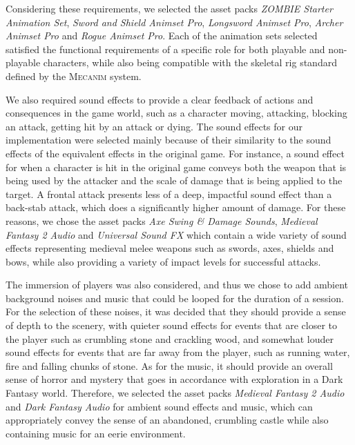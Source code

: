 Considering these requirements, we selected the asset packs \emph{ZOMBIE Starter Animation Set}, \emph{Sword and Shield Animset Pro}, \emph{Longsword Animset Pro}, \emph{Archer Animset Pro} and \emph{Rogue Animset Pro}. Each of the animation sets selected satisfied the functional requirements of a specific role for both playable and non-playable characters, while also being compatible with the skeletal rig standard defined by the \textsc{Mecanim} system.

We also required sound effects to provide a clear feedback of actions and consequences in the game world, such as a character moving, attacking, blocking an attack, getting hit by an attack or dying. The sound effects for our implementation were selected mainly because of their similarity to the sound effects of the equivalent effects in the original game. For instance, a sound effect for when a character is hit in the original game conveys both the weapon that is being used by the attacker and the scale of damage that is being applied to the target. A frontal attack presents less of a deep, impactful sound effect than a back-stab attack, which does a significantly higher amount of damage. For these reasons, we chose the asset packs \emph{Axe Swing \& Damage Sounds}, \emph{Medieval Fantasy 2 Audio} and \emph{Universal Sound FX} which contain a wide variety of sound effects representing medieval melee weapons such as swords, axes, shields and bows, while also providing a variety of impact levels for successful attacks.

The immersion of players was also considered, and thus we chose to add ambient background noises and music that could be looped for the duration of a session. For the selection of these noises, it was decided that they should provide a sense of depth to the scenery, with quieter sound effects for events that are closer to the player such as crumbling stone and crackling wood, and somewhat louder sound effects for events that are far away from the player, such as running water, fire and falling chunks of stone. As for the music, it should provide an overall sense of horror and mystery that goes in accordance with exploration in a Dark Fantasy world. Therefore, we selected the asset packs \emph{Medieval Fantasy 2 Audio} and \emph{Dark Fantasy Audio} for ambient sound effects and music, which can appropriately convey the sense of an abandoned, crumbling castle while also containing music for an eerie environment.

